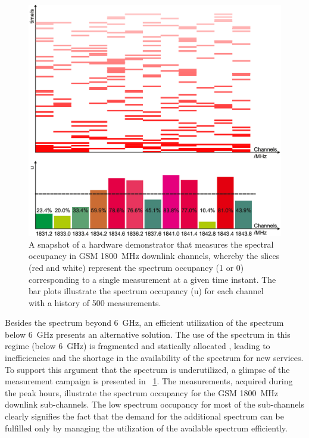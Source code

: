 \begin{figure}[!t]
\centering
\includegraphics[width = 0.9\columnwidth]{figures/Grafik_Poster}
\caption{A snapshot of a hardware demonstrator that measures the spectral occupancy in GSM \SI{1800}{MHz} downlink channels, whereby the slices (red and white) represent the spectrum occupancy (1 or 0) corresponding to a single measurement at a given time instant. The bar plots illustrate the spectrum occupancy (u) for each channel with a history of 500 measurements\protect{}.}
\label{fig_Int:HW_I}
\end{figure}


Besides the spectrum beyond \SI{6}{GHz}, an efficient utilization of the spectrum below \SI{6}{GHz} presents an alternative solution. The use of the spectrum in this regime (below \SI{6}{GHz}) is fragmented and statically allocated \cite{Mchen05, Mchen07}, leading to inefficiencies and the shortage in the availability of the spectrum for new services. To support this argument that the spectrum is underutilized, a glimpse of the measurement campaign is presented in \figurename~\ref{fig_Int:HW_I}. The measurements, acquired during the peak hours, illustrate the spectrum occupancy for the GSM \SI{1800}{MHz} downlink sub-channels. The low spectrum occupancy for most of the sub-channels clearly signifies the fact that the demand for the additional spectrum can be fulfilled only by managing the utilization of the available spectrum efficiently. 

